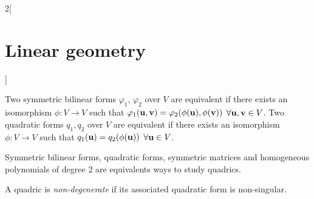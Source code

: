 \documentclass[../../../main.tex]{subfiles}
\begin{document}
\begin{multicols}{2}[\section{Linear geometry}]
\begin{definition}
\begin{enumerate}
    \end{enumerate}
  \end{definition}
  \begin{prop}
    Two symmetric bilinear forms $\varphi_1$, $\varphi_2$ over $V$ are equivalent if there exists an isomorphism $\phi:V\rightarrow V$ such that $\varphi_1(\boldsymbol{\mathrm{u}},\boldsymbol{\mathrm{v}})=\varphi_2(\phi(\boldsymbol{\mathrm{u}}),\phi(\boldsymbol{\mathrm{v}}))$ $\forall\boldsymbol{\mathrm{u}},\boldsymbol{\mathrm{v}}\in V$.\newline
    Two quadratic forms $q_1,q_2$ over $V$ are equivalent if there exists an isomorphism $\phi:V\rightarrow V$ such that $q_1(\boldsymbol{\mathrm{u}})=q_2(\phi(\boldsymbol{\mathrm{u}}))$ $\forall\boldsymbol{\mathrm{u}}\in V$.
  \end{prop}
  \begin{theorem}
    Symmetric bilinear forms, quadratic forms, symmetric matrices and homogeneous polynomials of degree 2 are equivalents ways to study quadrics.
  \end{theorem}
  \begin{definition}
    A quadric is \textit{non-degenerate} if its associated quadratic form is non-singular.
  \end{definition}

\end{multicols}
\end{document}
